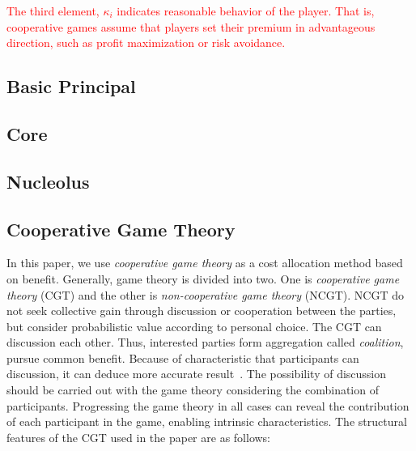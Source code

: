 \documentclass[journal]{IEEEtran} %
\begin{document}
\textcolor{red}{The third element, $\kappa_i$ indicates reasonable behavior of the player. That is, cooperative games assume that players set their premium in advantageous direction, such as profit maximization or risk avoidance.}


\subsection{Basic Principal}

\subsection{Core}

\subsection{Nucleolus}

\subsection{Cooperative Game Theory}
In this paper, we use \textit{cooperative game theory} as a cost allocation method based on benefit. Generally, game theory is divided into two. One is \textit{cooperative game theory} (CGT) and the other is \textit{non-cooperative game theory} (NCGT). NCGT do not seek collective gain through discussion or cooperation between the parties, but consider probabilistic value according to personal choice. The CGT can discussion each other. Thus, interested parties form aggregation called \textit{coalition}, pursue common benefit. Because of characteristic that participants can discussion, it can deduce more accurate result~\cite{zolezzi2002}. The possibility of discussion should be carried out with the game theory considering the combination of participants. Progressing the game theory in all cases can reveal the contribution of each participant in the game, enabling intrinsic characteristics. The structural features of the CGT used in the paper are as follows:



\end{document}
